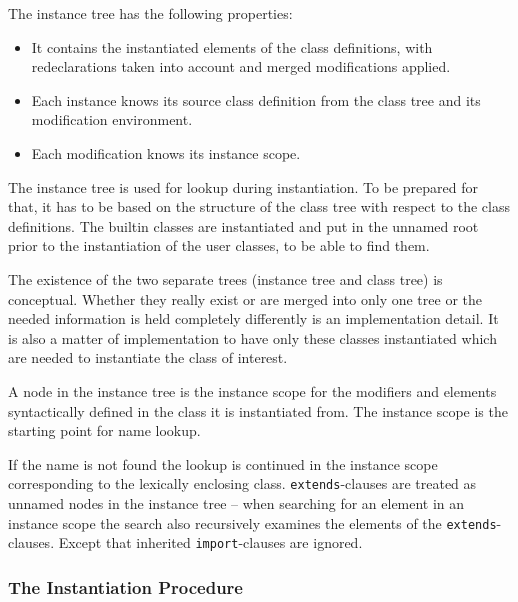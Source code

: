 The instance tree has the following properties:
\begin{itemize}
\item
  It contains the instantiated elements of the class definitions, with redeclarations taken into account and merged modifications applied.
\end{itemize}

\begin{itemize}
\item
  Each instance knows its source class definition from the class tree and its modification environment.
\item
  Each modification knows its instance scope.
\end{itemize}

The instance tree is used for lookup during instantiation.
To be prepared for that, it has to be based on the structure of the class tree with respect to the class definitions.
The builtin classes are instantiated and put in the unnamed root prior to the instantiation of the user classes, to be able to find them.

\begin{nonnormative}
The existence of the two separate trees (instance tree and class tree) is conceptual.
Whether they really exist or are merged into only one tree or the needed information is held completely differently is an implementation detail.
It is also a matter of implementation to have only these classes instantiated which are needed to instantiate the class of interest.
\end{nonnormative}

A node in the instance tree is the instance scope for the modifiers and elements syntactically defined in the class it is instantiated from.
The instance scope is the starting point for name lookup.

\begin{nonnormative}
If the name is not found the lookup is continued in the instance scope corresponding to the lexically enclosing class.
\lstinline!extends!-clauses are treated as unnamed nodes in the instance tree -- when searching for an element in an instance scope the search also recursively examines the elements of the \lstinline!extends!-clauses.
Except that inherited \lstinline!import!-clauses are ignored.
\end{nonnormative}


\subsubsection{The Instantiation Procedure}\label{the-instantiation-procedure}

